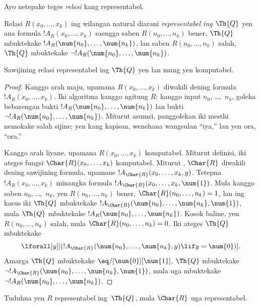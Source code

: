 \documentclass[../../../include/open-logic-section]{subfiles}
\begin{document}


Ayo netepake teges \emph{relasi} kang representabel.

\begin{defn}
 Relasi $R(x_0,\dots,x_k)$
ing wilangan natural diarani {\em representabel ing $\Th{Q}$} yen ana
formula $!A_R(x_0,\dots,x_k)$ saengga saben $R(n_0,\dots,n_k)$ bener,
$\Th{Q}$ mbuktekake $!A_R(\num{n_0},\dots,\num{n_k})$, lan saben
$R(n_0,\dots,n_k)$ salah, $\Th{Q}$ mbuktekake
$\lnot !A_R(\num{n_0}, \dots, \num{n_k})$.
\end{defn}

\begin{thm}
 Sawijining relasi representabel ing
$\Th{Q}$ yen lan mung yen komputabel.
\end{thm}

\begin{proof}
Kanggo arah maju, upamana $R(x_0,\dots,x_k)$ diwakili
dening formula $!A_R(x_0,\dots,x_k)$. Iki algoritma kanggo ngitung
$R$: kanggo input $n_0$, \dots,~$n_k$, goleka bebarengan bukti
$!A_R(\num{n_0}, \dots, \num{n_k})$ lan bukti
$\lnot !A_R(\num{n_0}, \dots, \num{n_k})$. Miturut asumsi, panggolekan
iki mesthi nemokake salah sijine; yen kang kapisan, wenehana wangsulan
``iya,'' lan yen ora, ``ora.''

Kanggo arah liyane, upamana $R(x_0, \dots, x_k)$ komputabel. Miturut
definisi, iki ateges fungsi $\Char{R}(x_0, \dots, x_k)$ komputabel.
Miturut , $\Char{R}$
diwakili dening sawijining formula, upamane
$!A_{\Char{R}}(x_0, \dots, x_k, y)$. Tetepna $!A_R(x_0, \dots, x_k)$
minangka formula $!A_{\Char{R}}(x_0, \dots, x_k, \num{1})$. Mula
kanggo saben $n_0$, \dots,~$n_k$, yen $R(n_0, \dots, n_k)$ bener,
$\Char{R}(n_0, \dots, n_k) = 1$, lan ing kasus iki $\Th{Q}$
mbuktekake $!A_{\Char{R}}(\num{n_0}, \dots, \num{n_k}, \num{1})$,
mula $\Th{Q}$ mbuktekake $!A_R(\num{n_0}, \dots, \num{n_k})$.
Kosok baline, yen $R(n_0, \dots, n_k)$ salah, mula
$\Char{R}(n_0, \dots, n_k) = 0$. Iki ateges $\Th{Q}$ mbuktekake
\[
\lforall[y][(!A_{\Char{R}}(\num{n_0}, \dots, \num{n_k}, y) \lif y =
  \num{0})].
\]
Amarga $\Th{Q}$ mbuktekake $\eq/[\num{0}][\num{1}]$, $\Th{Q}$
mbuktekake $\lnot !A_{\Char{R}}(\num{n_0}, \dots, \num{n_k}, \num{1})$,
mula uga mbuktekake $\lnot !A_R(\num{n_0}, \dots, \num{n_k})$.
\end{proof}

\begin{prob}
Tuduhna yen $R$ representabel ing~$\Th{Q}$, mula $\Char{R}$ uga
representabel.
\end{prob}
\end{document}
